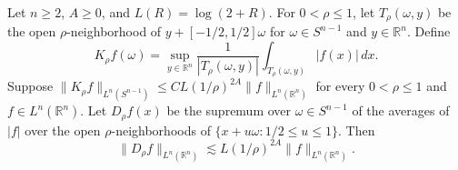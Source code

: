 Let \(n\ge2\), \(A\ge0\), and \(L(R)=\log(2+R)\). For \(0<\rho\le1\), let \(T_\rho(\omega,y)\) be the open \(\rho\)-neighborhood of \(y+[-1/2,1/2]\omega\) for \(\omega\in S^{n-1}\) and \(y\in\mathbb R^n\). Define
\[
 K_\rho f(\omega)=\sup_{y\in\mathbb R^n}
 \frac{1}{|T_\rho(\omega,y)|}\int_{T_\rho(\omega,y)}|f(x)|\,dx .
\]
Suppose
\(\|K_\rho f\|_{L^n(S^{n-1})}\le C L(1/\rho)^{2A}\|f\|_{L^n(\mathbb R^n)}\) for every \(0<\rho\le1\) and \(f\in L^n(\mathbb R^n)\). Let \(D_\rho f(x)\) be the supremum over \(\omega\in S^{n-1}\) of the averages of \(|f|\) over the open \(\rho\)-neighborhoods of \(\{x+u\omega:1/2\le u\le1\}\). Then
\[
 \|D_\rho f\|_{L^n(\mathbb R^n)}\lesssim L(1/\rho)^{2A}\|f\|_{L^n(\mathbb R^n)}.
\]
